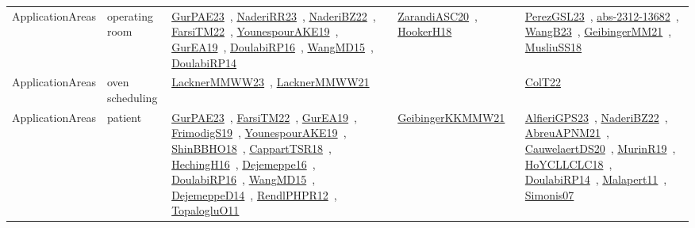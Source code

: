 {\begin{longtable}{lp{3cm}>{\raggedright\arraybackslash}p{6cm}>{\raggedright\arraybackslash}p{6cm}>{\raggedright\arraybackslash}p{8cm}}
ApplicationAreas & operating room & \href{works/GurPAE23.pdf}{GurPAE23}~\cite{GurPAE23}, \href{works/NaderiRR23.pdf}{NaderiRR23}~\cite{NaderiRR23}, \href{works/NaderiBZ22.pdf}{NaderiBZ22}~\cite{NaderiBZ22}, \href{works/FarsiTM22.pdf}{FarsiTM22}~\cite{FarsiTM22}, \href{works/YounespourAKE19.pdf}{YounespourAKE19}~\cite{YounespourAKE19}, \href{works/GurEA19.pdf}{GurEA19}~\cite{GurEA19}, \href{works/DoulabiRP16.pdf}{DoulabiRP16}~\cite{DoulabiRP16}, \href{works/WangMD15.pdf}{WangMD15}~\cite{WangMD15}, \href{works/DoulabiRP14.pdf}{DoulabiRP14}~\cite{DoulabiRP14} & \href{works/ZarandiASC20.pdf}{ZarandiASC20}~\cite{ZarandiASC20}, \href{works/HookerH18.pdf}{HookerH18}~\cite{HookerH18} & \href{works/PerezGSL23.pdf}{PerezGSL23}~\cite{PerezGSL23}, \href{works/abs-2312-13682.pdf}{abs-2312-13682}~\cite{abs-2312-13682}, \href{works/WangB23.pdf}{WangB23}~\cite{WangB23}, \href{works/GeibingerMM21.pdf}{GeibingerMM21}~\cite{GeibingerMM21}, \href{works/MusliuSS18.pdf}{MusliuSS18}~\cite{MusliuSS18}\\
ApplicationAreas & oven scheduling & \href{works/LacknerMMWW23.pdf}{LacknerMMWW23}~\cite{LacknerMMWW23}, \href{works/LacknerMMWW21.pdf}{LacknerMMWW21}~\cite{LacknerMMWW21} &  & \href{works/ColT22.pdf}{ColT22}~\cite{ColT22}\\
ApplicationAreas & patient & \href{works/GurPAE23.pdf}{GurPAE23}~\cite{GurPAE23}, \href{works/FarsiTM22.pdf}{FarsiTM22}~\cite{FarsiTM22}, \href{works/GurEA19.pdf}{GurEA19}~\cite{GurEA19}, \href{works/FrimodigS19.pdf}{FrimodigS19}~\cite{FrimodigS19}, \href{works/YounespourAKE19.pdf}{YounespourAKE19}~\cite{YounespourAKE19}, \href{works/ShinBBHO18.pdf}{ShinBBHO18}~\cite{ShinBBHO18}, \href{works/CappartTSR18.pdf}{CappartTSR18}~\cite{CappartTSR18}, \href{works/HechingH16.pdf}{HechingH16}~\cite{HechingH16}, \href{works/Dejemeppe16.pdf}{Dejemeppe16}~\cite{Dejemeppe16}, \href{works/DoulabiRP16.pdf}{DoulabiRP16}~\cite{DoulabiRP16}, \href{works/WangMD15.pdf}{WangMD15}~\cite{WangMD15}, \href{works/DejemeppeD14.pdf}{DejemeppeD14}~\cite{DejemeppeD14}, \href{works/RendlPHPR12.pdf}{RendlPHPR12}~\cite{RendlPHPR12}, \href{works/TopalogluO11.pdf}{TopalogluO11}~\cite{TopalogluO11} & \href{works/GeibingerKKMMW21.pdf}{GeibingerKKMMW21}~\cite{GeibingerKKMMW21} & \href{works/AlfieriGPS23.pdf}{AlfieriGPS23}~\cite{AlfieriGPS23}, \href{works/NaderiBZ22.pdf}{NaderiBZ22}~\cite{NaderiBZ22}, \href{works/AbreuAPNM21.pdf}{AbreuAPNM21}~\cite{AbreuAPNM21}, \href{works/CauwelaertDS20.pdf}{CauwelaertDS20}~\cite{CauwelaertDS20}, \href{works/MurinR19.pdf}{MurinR19}~\cite{MurinR19}, \href{works/HoYCLLCLC18.pdf}{HoYCLLCLC18}~\cite{HoYCLLCLC18}, \href{works/DoulabiRP14.pdf}{DoulabiRP14}~\cite{DoulabiRP14}, \href{works/Malapert11.pdf}{Malapert11}~\cite{Malapert11}, \href{works/Simonis07.pdf}{Simonis07}~\cite{Simonis07}\\

\end{longtable}}
